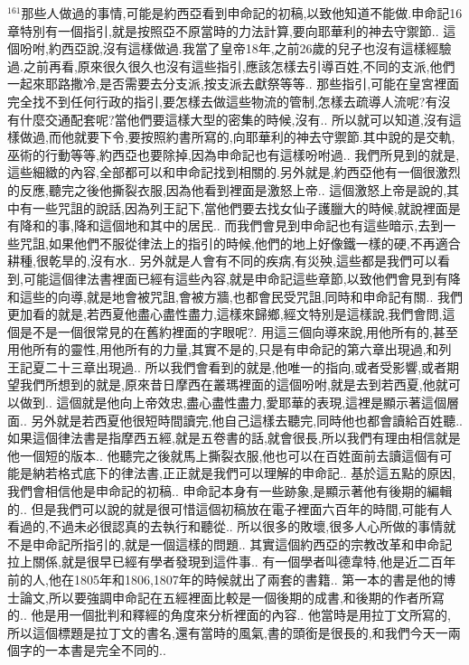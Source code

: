 \documentclass{book}
\begin{document}
$^{161}$那些人做過的事情,可能是約西亞看到申命記的初稿,以致他知道不能做.申命記16章特別有一個指引,就是按照亞不原當時的力法計算,要向耶華利的神去守禦節..
這個吩咐,約西亞說,沒有這樣做過.我當了皇帝18年,之前26歲的兒子也沒有這樣經驗過.之前再看,原來很久很久也沒有這些指引,應該怎樣去引導百姓,不同的支派,他們一起來耶路撒冷,是否需要去分支派,按支派去獻祭等等..
那些指引,可能在皇宮裡面完全找不到任何行政的指引,要怎樣去做這些物流的管制,怎樣去疏導人流呢?有沒有什麼交通配套呢?當他們要這樣大型的密集的時候,沒有..
所以就可以知道,沒有這樣做過,而他就要下令,要按照約書所寫的,向耶華利的神去守禦節.其中說的是交軌,巫術的行動等等,約西亞也要除掉,因為申命記也有這樣吩咐過..
我們所見到的就是,這些細緻的內容,全部都可以和申命記找到相關的.另外就是,約西亞他有一個很激烈的反應,聽完之後他撕裂衣服,因為他看到裡面是激怒上帝..
這個激怒上帝是說的,其中有一些咒詛的說話,因為列王記下,當他們要去找女仙子護臘大的時候,就說裡面是有降和的事,降和這個地和其中的居民..
而我們會見到申命記也有這些暗示,去到一些咒詛,如果他們不服從律法上的指引的時候,他們的地上好像鐵一樣的硬,不再適合耕種,很乾旱的,沒有水..
另外就是人會有不同的疾病,有災殃,這些都是我們可以看到,可能這個律法書裡面已經有這些內容,就是申命記這些章節,以致他們會見到有降和這些的向導,就是地會被咒詛,會被方牆,也都會民受咒詛,同時和申命記有關..
我們更加看的就是,若西夏他盡心盡性盡力,這樣來歸鄉,經文特別是這樣說,我們會問,這個是不是一個很常見的在舊約裡面的字眼呢?.
用這三個向導來說,用他所有的,甚至用他所有的靈性,用他所有的力量,其實不是的,只是有申命記的第六章出現過,和列王記夏二十三章出現過..
所以我們會看到的就是,他唯一的指向,或者受影響,或者期望我們所想到的就是,原來昔日摩西在叢瑪裡面的這個吩咐,就是去到若西夏,他就可以做到..
這個就是他向上帝效忠,盡心盡性盡力,愛耶華的表現,這裡是顯示著這個層面..
另外就是若西夏他很短時間讀完,他自己這樣去聽完,同時他也都會讀給百姓聽..
如果這個律法書是指摩西五經,就是五卷書的話,就會很長,所以我們有理由相信就是他一個短的版本..
他聽完之後就馬上撕裂衣服,他也可以在百姓面前去讀這個有可能是納若格式底下的律法書,正正就是我們可以理解的申命記..
基於這五點的原因,我們會相信他是申命記的初稿..
申命記本身有一些跡象,是顯示著他有後期的編輯的..
但是我們可以說的就是很可惜這個初稿放在電子裡面六百年的時間,可能有人看過的,不過未必很認真的去執行和聽從..
所以很多的敗壞,很多人心所做的事情就不是申命記所指引的,就是一個這樣的問題..
其實這個約西亞的宗教改革和申命記拉上關係,就是很早已經有學者發現到這件事..
有一個學者叫德韋特,他是近二百年前的人,他在1805年和1806,1807年的時候就出了兩套的書籍..
第一本的書是他的博士論文,所以要強調申命記在五經裡面比較是一個後期的成書,和後期的作者所寫的..
他是用一個批判和釋經的角度來分析裡面的內容..
他當時是用拉丁文所寫的,所以這個標題是拉丁文的書名,還有當時的風氣,書的頭銜是很長的,和我們今天一兩個字的一本書是完全不同的..
\end{document}
